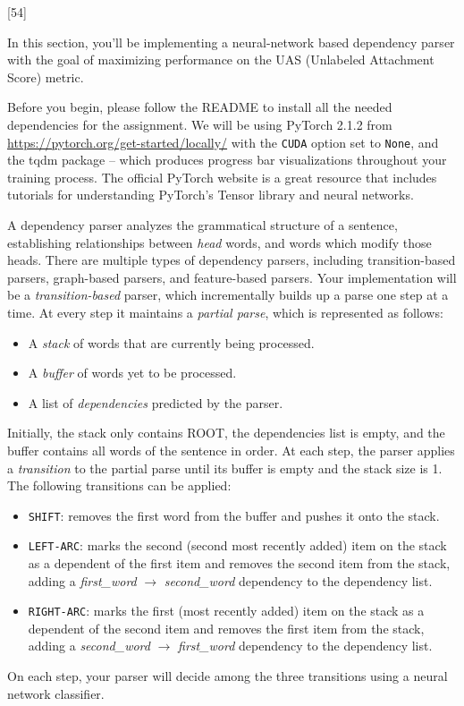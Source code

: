 [54]

In this section, you'll be implementing a neural-network based dependency parser with the goal of maximizing performance on the UAS (Unlabeled Attachment Score) metric.\newline

Before you begin, please follow the README to install all the needed dependencies for the assignment. We will be using PyTorch 2.1.2 from \url{https://pytorch.org/get-started/locally/} with the \texttt{CUDA} option set to \texttt{None}, and the tqdm package -- which produces progress bar visualizations throughout your training process. The official PyTorch website is a great resource that includes tutorials for understanding PyTorch's Tensor library and neural networks. \newline

A dependency parser analyzes the grammatical structure of a sentence, establishing relationships between \textit{head} words, and words which modify those heads. There are multiple types of dependency parsers, including transition-based parsers, graph-based parsers, and feature-based parsers. Your implementation will be a {\it transition-based} parser, which incrementally builds up a parse one step at a time. At every step it maintains a \textit{partial parse}, which is represented as follows:
\begin{itemize}
    \item A {\it stack} of words that are currently being processed.
    \item A {\it buffer} of words yet to be processed.
    \item A list of {\it dependencies} predicted by the parser.
\end{itemize}
Initially, the stack only contains ROOT, the dependencies list is empty, and the buffer contains all words of the sentence in order. At each step, the parser applies a {\it transition} to the partial parse until its buffer is empty and the stack size is 1. The following transitions can be applied:
\begin{itemize}
    \item \texttt{SHIFT}: removes the first word from the buffer and pushes it onto the stack.
    \item \texttt{LEFT-ARC}: marks the second (second most recently added) item on the stack as a dependent of the first item and removes the second item from the stack, adding a \textit{first\_word} $\rightarrow$ \textit{second\_word} dependency to the dependency list.
    \item \texttt{RIGHT-ARC}: marks the first (most recently added) item on the stack as a dependent of the second item and removes the first item from the stack, adding a \textit{second\_word} $\rightarrow$ \textit{first\_word} dependency to the dependency list.
\end{itemize}
On each step, your parser will decide among the three transitions using a neural network classifier.

